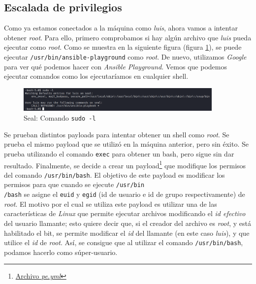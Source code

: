 \subsection{Escalada de privilegios}

Como ya estamos conectados a la máquina como \textit{luis}, ahora vamos a intentar obtener \textit{root}. Para ello, primero comprobamos si hay algún archivo que \textit{luis} pueda ejecutar como \textit{root}. Como se muestra en la siguiente figura (figura \ref{fig:seal-sudo}), se puede ejecutar \texttt{/usr/bin/ansible-playground} como \textit{root}. De nuevo, utilizamos \textit{Google} para ver qué podemos hacer con \textit{Ansible Playground}\cite{ansible-playbooks}. Vemos que podemos ejecutar comandos como los ejecutaríamos en cualquier shell.
\begin{figure}[h]
    \centering
    \includegraphics[width=0.9\textwidth]{images/machines/seal/sudo-l-luis.png}
    \caption{Seal: Comando \texttt{sudo -l}}
    \label{fig:seal-sudo}
\end{figure}

Se prueban distintos payloads para intentar obtener un shell como \textit{root}. Se prueba el mismo payload que se utilizó en la máquina anterior, pero sin éxito. Se prueba utilizando el comando \texttt{exec} para obtener un bash, pero sigue sin dar resultado. Finalmente, se decide a crear un payload\footnote{\href{https://github.com/VictorNS69/TFM/blob/main/machines/seal/pe.yml}{Archivo \textit{pe.yml}}} que modifique los permisos del comando \texttt{/usr/bin/bash}. El objetivo de este payload es modificar los permisos para que cuando se ejecute \texttt{/usr/bin\\/bash} se asigne el \texttt{euid} y \texttt{egid} (id de usuario e id de grupo respectivamente) de \textit{root}. El motivo por el cual se utiliza este payload es utilizar una de las características de \textit{Linux} que permite ejecutar archivos modificando el \textit{id efectivo} del usuario llamante; esto quiere decir que, si el creador del archivo es \textit{root}, y está habilitado el bit, se permite modificar el \textit{id} del llamante (en este caso \textit{luis}), y que utilice el \textit{id} de \textit{root}. Así, se consigue que al utilizar el comando \texttt{/usr/bin/bash}, podamos hacerlo como súper-usuario.\\

